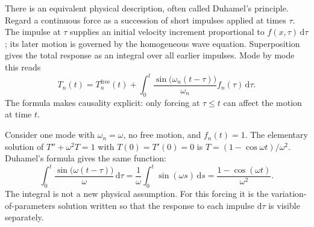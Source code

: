 There is an equivalent physical description, often called Duhamel's principle. Regard a continuous force as a succession of short impulses applied at times $\tau$. The impulse at $\tau$ supplies an initial velocity increment proportional to $f(x,\tau)\,\mathrm{d}\tau$; its later motion is governed by the homogeneous wave equation. Superposition gives the total response as an integral over all earlier impulses. Mode by mode this reads
\begin{equation}
T_n(t)=T_n^{\mathrm{free}}(t)
+\int_0^t\frac{\sin\bigl(\omega_n(t-\tau)\bigr)}{\omega_n}
f_n(\tau)\,\mathrm{d}\tau.
\end{equation}
The formula makes causality explicit: only forcing at $\tau\leq t$ can affect the motion at time $t$.

\begin{example}
Consider one mode with $\omega_n=\omega$, no free motion, and $f_n(t)=1$. The elementary solution of $T''+\omega^2 T=1$ with $T(0)=T'(0)=0$ is $T=(1-\cos\omega t)/\omega^2$. Duhamel's formula gives the same function:
\begin{equation}
\int_0^{t}\frac{\sin\bigl(\omega(t-\tau)\bigr)}{\omega}\,\mathrm{d}\tau
=\frac{1}{\omega}\int_0^{t}\sin(\omega s)\,\mathrm{d}s
=\frac{1-\cos(\omega t)}{\omega^2}.
\end{equation}
The integral is not a new physical assumption. For this forcing it is the variation-of-parameters solution written so that the response to each impulse $\mathrm{d}\tau$ is visible separately.
\end{example}